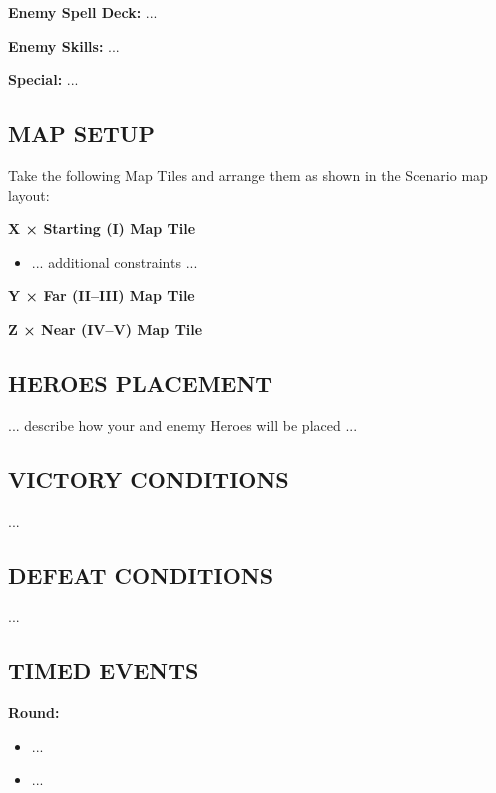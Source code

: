 \begin{multicols*}{2}
\textbf{Enemy Spell Deck:} ...

\textbf{Enemy Skills:} ...

\textbf{Special:} ...

\subsection*{\MakeUppercase{Map Setup}}

Take the following Map Tiles and arrange them as shown in the Scenario map layout:

\textbf{X × Starting (I) Map Tile}
\begin{itemize}
    \item ... additional constraints ...
\end{itemize}

\textbf{Y × Far (II--III) Map Tile}

\textbf{Z × Near (IV--V) Map Tile}

\subsection*{\MakeUppercase{Heroes Placement}}

... describe how your and enemy Heroes will be placed ...

\subsection*{\MakeUppercase{Victory Conditions}}
...

\subsection*{\MakeUppercase{Defeat Conditions}}
...

\subsection*{\MakeUppercase{Timed Events}}

%

\textbf{ Round:}
\begin{itemize}
  \item ...
  \item ...
\end{itemize}

%
%
%


\end{multicols*}

